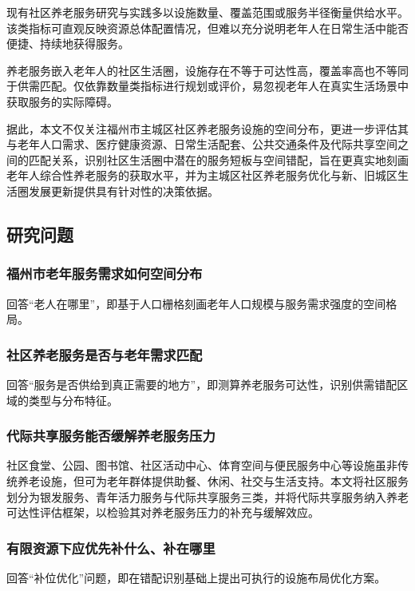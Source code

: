 现有社区养老服务研究与实践多以设施数量、覆盖范围或服务半径衡量供给水平。该类指标可直观反映资源总体配置情况，但难以充分说明老年人在日常生活中能否便捷、持续地获得服务。

养老服务嵌入老年人的社区生活圈，设施存在不等于可达性高，覆盖率高也不等同于供需匹配。仅依靠数量类指标进行规划或评价，易忽视老年人在真实生活场景中获取服务的实际障碍。

据此，本文不仅关注福州市主城区社区养老服务设施的空间分布，更进一步评估其与老年人口需求、医疗健康资源、日常生活配套、公共交通条件及代际共享空间之间的匹配关系，识别社区生活圈中潜在的服务短板与空间错配，旨在更真实地刻画老年人综合性养老服务的获取水平，并为主城区社区养老服务优化与新、旧城区生活圈发展更新提供具有针对性的决策依据。

\subsection{研究问题}

\subsubsection{福州市老年服务需求如何空间分布}

回答“老人在哪里”，即基于人口栅格刻画老年人口规模与服务需求强度的空间格局。

\subsubsection{社区养老服务是否与老年需求匹配}

回答“服务是否供给到真正需要的地方”，即测算养老服务可达性，识别供需错配区域的类型与分布特征。

\subsubsection{代际共享服务能否缓解养老服务压力}

社区食堂、公园、图书馆、社区活动中心、体育空间与便民服务中心等设施虽非传统养老设施，但可为老年群体提供助餐、休闲、社交与生活支持。本文将社区服务划分为银发服务、青年活力服务与代际共享服务三类，并将代际共享服务纳入养老可达性评估框架，以检验其对养老服务压力的补充与缓解效应。

\subsubsection{有限资源下应优先补什么、补在哪里}

回答“补位优化”问题，即在错配识别基础上提出可执行的设施布局优化方案。

